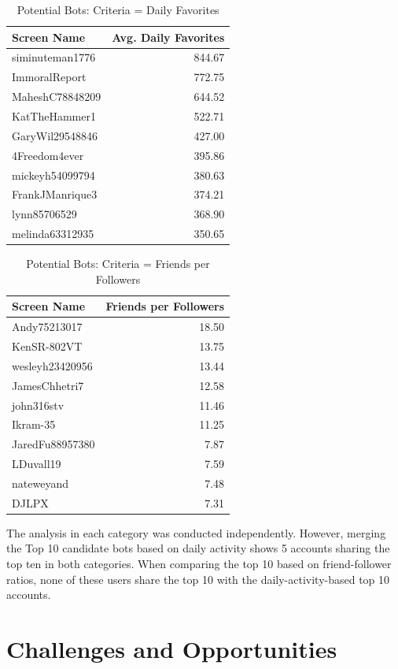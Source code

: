 \begin{table}[htb]
\centering
\caption{Potential Bots: Criteria = Daily Favorites}
\label{t:faves-top10}
\begin{tabular}{lr}
Screen Name & Avg. Daily Favorites \\
\toprule
siminuteman1776 & 844.67 \\
ImmoralReport   & 772.75 \\
MaheshC78848209 & 644.52 \\
KatTheHammer1   & 522.71 \\
GaryWil29548846 & 427.00 \\
4Freedom4ever   & 395.86 \\
mickeyh54099794 & 380.63 \\
FrankJManrique3 & 374.21 \\
lynn85706529    & 368.90 \\
melinda63312935 & 350.65  
\end{tabular}
\end{table}

\begin{table}[htb]
\centering
\caption{Potential Bots: Criteria = Friends per Followers}
\label{t:ratio-top10}
\begin{tabular}{lr}
Screen Name & Friends per Followers \\
\toprule
Andy75213017    & 18.50 \\
KenSR-802VT     & 13.75 \\
wesleyh23420956 & 13.44 \\
JamesChhetri7   & 12.58 \\
john316stv      & 11.46 \\
Ikram-35        & 11.25 \\
JaredFu88957380 & 7.87 \\
LDuvall19       & 7.59 \\
nateweyand      & 7.48 \\
DJLPX           & 7.31  
\end{tabular}
\end{table}

The analysis in each category was conducted independently. However, merging the
Top 10 candidate bots based on daily activity shows 5 accounts sharing the top
ten in both categories. When comparing the top 10 based on friend-follower
ratios, none of these users share the top 10 with the daily-activity-based top
10 accounts.

\section{Challenges and Opportunities}

